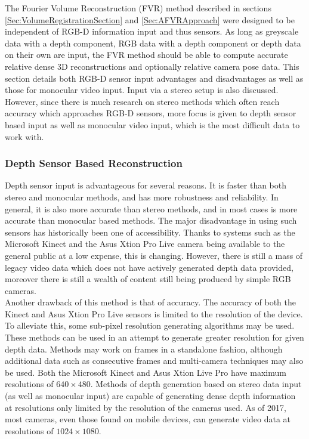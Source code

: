 
The Fourier Volume Reconstruction (FVR) method described in sections \ref{Sec:VolumeRegistrationSection} and \ref{Sec:AFVRApproach} were designed to be independent of RGB-D information input and thus sensors. As long as greyscale data with a depth component, RGB data with a depth component or depth data on their own are input, the FVR method should be able to compute accurate relative dense 3D reconstructions and optionally relative camera pose data. This section details both RGB-D sensor input advantages and disadvantages as well as those for monocular video input. Input via a stereo setup is also discussed. However, since there is much research on stereo methods which often reach accuracy which approaches RGB-D sensors, more focus is given to depth sensor based input as well as monocular video input, which is the most difficult data to work with. \\

\subsubsection{Depth Sensor Based Reconstruction}

Depth sensor input is advantageous for several reasons. It is faster than both stereo and monocular methods, and has more robustness and reliability. In general, it is also more accurate than stereo methods, and in most cases is more accurate than monocular based methods. The major disadvantage in using such sensors has historically been one of accessibility. Thanks to systems such as the Microsoft Kinect and the Asus Xtion Pro Live camera being available to the general public at a low expense, this is changing. However, there is still a mass of legacy video data which does not have actively generated depth data provided, moreover there is still a wealth of content still being produced by simple RGB cameras. \\

Another drawback of this method is that of accuracy. The accuracy of both the Kinect and Asus Xtion Pro Live sensors is limited to the resolution of the device. To alleviate this, some sub-pixel resolution generating algorithms may be used. These methods can be used in an attempt to generate greater resolution for given depth data. Methods may work on frames in a standalone fashion, although additional data such as consecutive frames and multi-camera techniques may also be used. Both the Microsoft Kinect and Asus Xtion Live Pro have maximum resolutions of $640 \times 480$. Methods of depth generation based on stereo data input (as well as monocular input) are capable of generating dense depth information at resolutions only limited by the resolution of the cameras used. As of 2017, most cameras, even those found on mobile devices, can generate video data at resolutions of $1024 \times 1080$. \\

